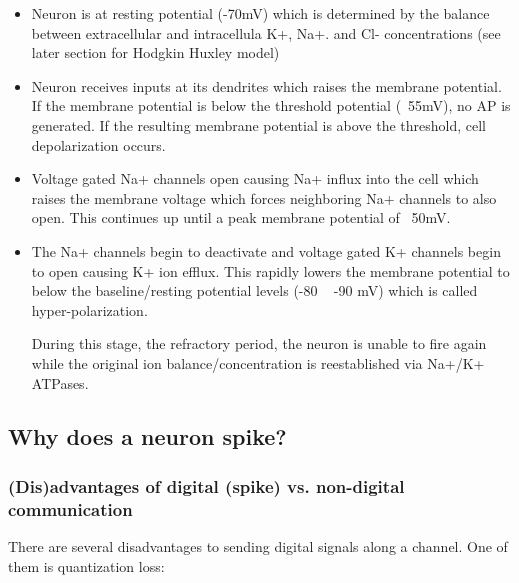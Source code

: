 \documentclass[main]{subfiles}
\begin{document}
\begin{itemize}
\item Neuron is at resting potential (-70mV) which is determined by the balance between extracellular and intracellula K+, Na+. and Cl- concentrations (see later section for Hodgkin Huxley model)

\item Neuron receives inputs at its dendrites which raises the membrane potential. If the membrane potential is below the threshold potential (~55mV), no AP is generated. If the resulting membrane potential is above the threshold, cell depolarization occurs.

\item Voltage gated Na+ channels open causing Na+ influx into the cell which raises the membrane voltage which forces neighboring Na+ channels to also open. This continues up until a peak membrane potential of ~50mV.

\item The Na+ channels begin to deactivate and voltage gated K+ channels begin to open causing K+ ion efflux. This rapidly lowers the membrane potential to below the baseline/resting potential levels (-80 ~ -90 mV) which is called hyper-polarization.

During this stage, the refractory period, the neuron is unable to fire again while the original ion balance/concentration is reestablished via Na+/K+ ATPases.
\end{itemize}

\subsection{Why does a neuron spike?}
\subsubsection{(Dis)advantages of digital (spike) vs. non-digital communication}

There are several disadvantages to sending digital signals along a channel.
One of them is quantization loss:
\end{document}
